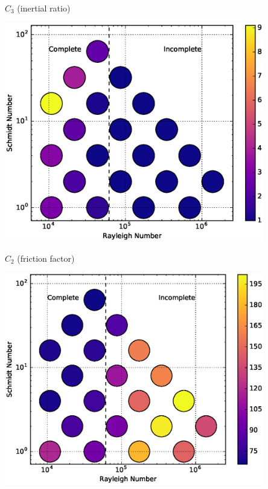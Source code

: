 \documentclass[12pt]{beamer}
\begin{document}
\begin{frame}[t]{$C_3$ (inertial ratio)}
\begin{center}
\vspace{-11pt}
\includegraphics[width=0.85\textwidth]{graphics/C3-vs-Rayleigh-Schmidt.eps}
\end{center}
\end{frame}

\begin{frame}[t]{$C_2$ (friction factor)}
\begin{center}
\vspace{-11pt}
\includegraphics[width=0.85\textwidth]{graphics/C2-vs-Rayleigh-Schmidt.eps}
\end{center}
\end{frame}
\end{document}
